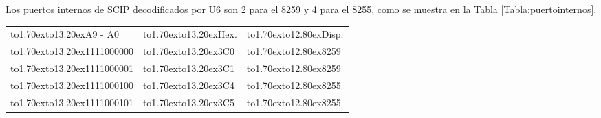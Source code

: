 Los puertos internos de SCIP decodificados por U6 son 2 para el 8259 y 4 para el 8255, como se %
muestra en la Tabla \ref{Tabla:puertointernos}.

\begin{table}[!htb]\centering
\begin{tabular}{|l|l|l|}
\cline{1-3}
\vbox to1.70ex{\vspace{1pt}\vfil\hbox to13.20ex{\hfil A9 - A0\hfil}\vfil} & 
\vbox to1.70ex{\vspace{1pt}\vfil\hbox to13.20ex{\hfil Hex.\hfil}\vfil} & 
\vbox to1.70ex{\vspace{1pt}\vfil\hbox to12.80ex{\hfil Disp.\hfil}\vfil} \\

\cline{1-3}
\vbox to1.70ex{\vspace{1pt}\vfil\hbox to13.20ex{\hfil 1111000000\hfil}\vfil} & 
\vbox to1.70ex{\vspace{1pt}\vfil\hbox to13.20ex{\hfil 3C0\hfil}\vfil} & 
\vbox to1.70ex{\vspace{1pt}\vfil\hbox to12.80ex{\hfil 8259\hfil}\vfil} \\

\cline{1-3}
\vbox to1.70ex{\vspace{1pt}\vfil\hbox to13.20ex{\hfil 1111000001\hfil}\vfil} & 
\vbox to1.70ex{\vspace{1pt}\vfil\hbox to13.20ex{\hfil 3C1\hfil}\vfil} & 
\vbox to1.70ex{\vspace{1pt}\vfil\hbox to12.80ex{\hfil 8259\hfil}\vfil} \\

\cline{1-3}
\vbox to1.70ex{\vspace{1pt}\vfil\hbox to13.20ex{\hfil 1111000100\hfil}\vfil} & 
\vbox to1.70ex{\vspace{1pt}\vfil\hbox to13.20ex{\hfil 3C4\hfil}\vfil} & 
\vbox to1.70ex{\vspace{1pt}\vfil\hbox to12.80ex{\hfil 8255\hfil}\vfil} \\

\cline{1-3}
\vbox to1.70ex{\vspace{1pt}\vfil\hbox to13.20ex{\hfil 1111000101\hfil}\vfil} & 
\vbox to1.70ex{\vspace{1pt}\vfil\hbox to13.20ex{\hfil 3C5\hfil}\vfil} & 
\vbox to1.70ex{\vspace{1pt}\vfil\hbox to12.80ex{\hfil 8255\hfil}\vfil} \\


\end{tabular}
\end{table}
